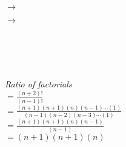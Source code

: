 \documentclass{article}
\begin{document}

            $\rightarrow$


            $\rightarrow$


            \hrulefill \\[10pt]

    \\

    \hrulefill \\[10pt]

    \\[5pt]
    \textit{Ratio of factorials}\\[15pt]

    $=\frac{(n+2)!}{(n-1)!}$\\[15pt]
    
    $= \frac{(n+1)(n+1)(n)(n-1)\cdots(1)}{(n-1)(n-2)(n-3)\cdots(1)}$\\[15pt]
    
    $= \frac{(n+1)(n+1)(n)(n-1)}{(n-1)}$\\[15pt]

    $= {(n+1)(n+1)(n)}$\\[15pt]
\end{document}
